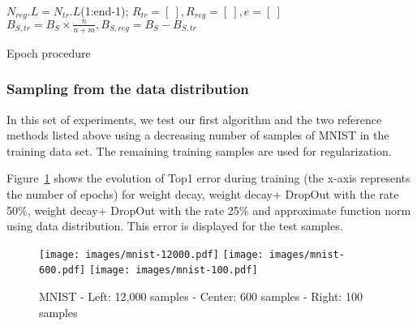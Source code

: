 \documentclass{article}
\begin{document}
\begin{center}
\begin{minipage}{.7\linewidth}
\begin{algorithm}[H]
 $N_{reg}.L = N_{tr}.L$(1:end-1);
 $R_{tr} = [\ ], R_{reg} = [\ ], e = [\ ]$\;
 $B_{S,tr} = B_S\times\frac{n}{n+m}, B_{S,reg} = B_S - B_{S,tr}$\;
 \caption{Epoch procedure}
 \label{alg1}
\end{algorithm}
\end{minipage}
\end{center}

\subsubsection{Sampling from the data distribution}
In this set of experiments, we test our first algorithm and the two reference methods listed above using a decreasing number of samples of MNIST in the training data set. The remaining training samples are used for regularization. 


Figure~\ref{reg-im-MNIST} shows the evolution of Top1 error during training (the x-axis represents the number of epochs) for weight decay, weight decay+ DropOut with the rate 50\%, weight decay+ DropOut with the rate 25\% and approximate function norm using data distribution. This error is displayed for the  test samples.
\begin{figure}[ht!]
\centering
\texttt{[image: images/mnist-12000.pdf]} \hfill 
\texttt{[image: images/mnist-600.pdf]} \hfill
\texttt{[image: images/mnist-100.pdf]}
\caption{MNIST - Left: 12,000 samples - Center: 600 samples - Right: 100 samples}
\label{reg-im-MNIST}
\end{figure}
\end{document}
